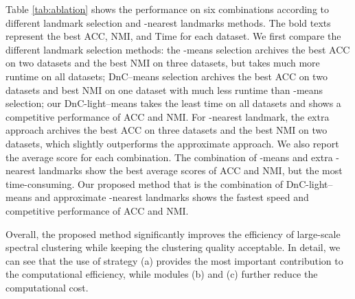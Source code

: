 Table \ref{tab:ablation} shows the performance on six combinations according to different landmark selection and -nearest landmarks methods.
The bold texts represent the best ACC, NMI, and Time for each dataset.
We first compare the different landmark selection methods:
the -means selection archives the best ACC on two datasets and the best NMI on three datasets, but takes much more runtime on all datasets;
DnC--means selection archives the best ACC on two datasets and best NMI on one dataset with much less runtime than -means selection;
our DnC-light--means takes the least time on all datasets and shows a competitive performance of ACC and NMI.
For -nearest landmark, the extra approach archives the best ACC on three datasets and the best NMI on two datasets, which slightly outperforms the approximate approach.
We also report the average score for each combination.
The combination of -means and extra -nearest landmarks show the best average scores of ACC and NMI, but the most time-consuming.
Our proposed method that is the combination of DnC-light--means and approximate -nearest landmarks shows the fastest speed and competitive performance of ACC and NMI.

Overall, the proposed method significantly improves the efficiency of large-scale spectral clustering while keeping the clustering quality acceptable.
In detail, we can see that the use of strategy (a) provides the most important contribution to the computational efficiency, while modules (b) and (c) further reduce the computational cost.